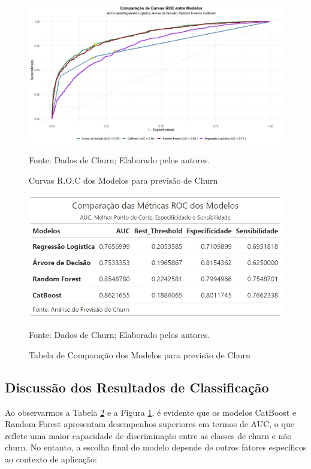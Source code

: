 \documentclass[a4paper,12pt]{article}[abntex2]
\begin{document}
\begin{figure}[H]
    \centering
    \caption{Curvas R.O.C dos Modelos para previsão de Churn} 
    \includegraphics[width=1.0\textwidth]{APS/i1A1.png}
    \label{fig:i1A1}
    
    \footnotesize{Fonte: Dados de Churn; Elaborado pelos autores.}
\end{figure}

\begin{figure}[H]
    \centering
    \caption{Tabela de Comparação dos Modelos para previsão de Churn} 
    \includegraphics[width=1.0\textwidth]{APS/i2A1.png}
    \label{fig:i2A1}
    
    \footnotesize{Fonte: Dados de Churn; Elaborado pelos autores.}
\end{figure}

\subsection*{\textbf{Discussão dos Resultados de Classificação}}


Ao observarmos a Tabela \ref{fig:i2A1} e a Figura \ref{fig:i1A1}, é evidente que os modelos CatBoost e Random Forest apresentam desempenhos superiores em termos de AUC, o que reflete uma maior capacidade de discriminação entre as classes de churn e não churn. No entanto, a escolha final do modelo depende de outros fatores específicos ao contexto de aplicação:
\end{document}
